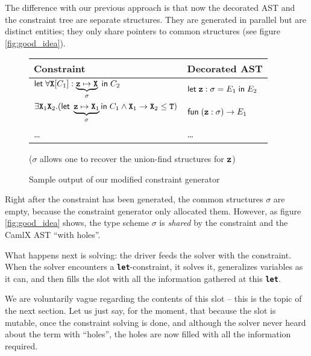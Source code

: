 \documentclass[10pt,a4paper,twoside,titlepage,twocolumn]{article}
\newcommand{\code}[1]{\textbf{\texttt{#1}}}
\begin{document}
The difference with our previous approach is that now the decorated AST
and the constraint tree are separate structures. They are generated in parallel
but are distinct entities; they only share pointers to common structures (see
figure \vref{fig:good_idea}).

\begin{figure}[h!]
  \small
    \begin{tabular}{l|l}
      \textbf{Constraint} & \textbf{Decorated AST} \\
      \hline


      $\cxlet{
          \forall\tvar[C_1]: \underbrace{\evar\mapsto\tvar}_{\sigma}
        }{C_2}$ &
        
      $\cxlet {\evar:\ts = E_1} {E_2}$ \\

      \hline


      $\exists\tvar_1\tvar_2.(
        \kwd{let}\;\underbrace{\evar\mapsto\tvar_1}_\sigma
        \kwd{in}\;{C_1}
        \wedge
        \tvar_1\arw\tvar_2\subtype\ttyp)$ &

      $\kwd{fun}\;(\evar: \sigma) \to E_1$ \\

      \hline

      \dots & \dots

    \end{tabular}
    (\centering $\sigma$ allows one to recover the union-find structures for $\evar$)
  \caption{Sample output of our modified constraint generator}
  \label{fig:good_idea}
\end{figure}

Right after the constraint has been generated, the common structures $\sigma$
are empty, because the constraint generator only allocated them. However, as
figure \vref{fig:good_idea} shows, the type scheme $\sigma$ is \emph{shared} by
the constraint and the CamlX AST ``with holes''.

What happens next is solving: the driver feeds the solver with the constraint.
When the solver encounters a \code{let}-constraint, it solves it, generalizes
variables as it can, and then fills the slot with all the information gathered
at this \code{let}.

We are voluntarily vague regarding the contents of this slot -- this is the
topic of the next section. Let us just say, for the moment, that because the
slot is mutable, once the constraint solving is done, and although the solver
never heard about the term with ``holes'', the holes are now filled with all the
information required.
\end{document}

